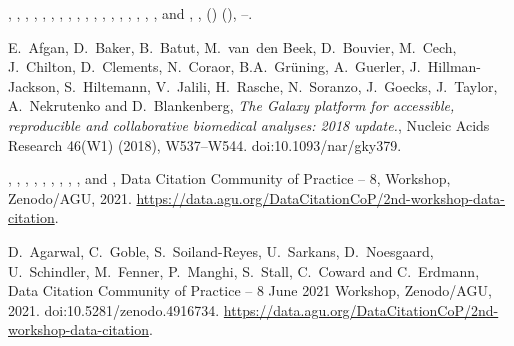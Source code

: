 \documentclass[ds,v1.1.2,openaccess]{iosart2x}%
\begin{document}
%
\begin{thebibliography}{}

%
\begin{barticle}
,
,
,
,
,
,
,
,
,
,
,
,
,
,
,
,
,
,
 and
,
,
()
(),
--.
\end{barticle}
%
\OrigBibText
E.~Afgan,
D.~Baker,
B.~Batut,
M.~van~den Beek,
D.~Bouvier,
M.~Cech,
J.~Chilton,
D.~Clements,
N.~Coraor,
B.A.~Gr\"{u}ning,
A.~Guerler,
J.~Hillman-Jackson,
S.~Hiltemann,
V.~Jalili,
H.~Rasche,
N.~Soranzo,
J.~Goecks,
J.~Taylor,
A.~Nekrutenko and
D.~Blankenberg,
\textit{The Galaxy platform for accessible, reproducible and collaborative
biomedical analyses: 2018 update.},
Nucleic Acids Research
46(W1)
(2018),
W537--W544.
doi:10.1093/nar/gky379.
\endOrigBibText
{}
\endbibitem

%
\begin{botherref}
,
,
,
,
,
,
,
,
,
 and
,
Data Citation Community of Practice -- 8,
Workshop, Zenodo/AGU, 2021.
\url{https://data.agu.org/DataCitationCoP/2nd-workshop-data-citation}.
\end{botherref}
%
\OrigBibText
D.~Agarwal,
C.~Goble,
S.~Soiland-Reyes,
U.~Sarkans,
D.~Noesgaard,
U.~Schindler,
M.~Fenner,
P.~Manghi,
S.~Stall,
C.~Coward and
C.~Erdmann,
Data Citation Community of Practice -- 8 June 2021 Workshop,
Zenodo/AGU,
2021.
doi:10.5281/zenodo.4916734.
\url{https://data.agu.org/DataCitationCoP/2nd-workshop-data-citation}.
\endOrigBibText
{}
\endbibitem


\end{thebibliography}
\end{document}
